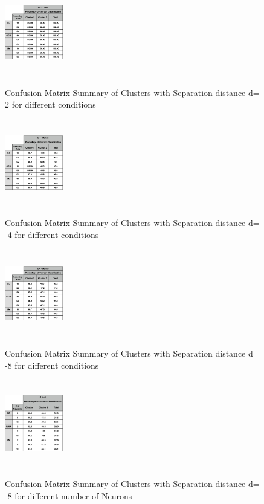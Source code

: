 \documentclass[conference]{IEEEtran}
\begin{document}
\begin{figure}[h!]
\centering
{\includegraphics[width=1in,height=1.5in,clip,keepaspectratio]{Confusion_Matrix_Summary_d2.png} }\\
\caption{Confusion Matrix Summary of Clusters with Separation distance d= 2 for different conditions}
\end{figure}
\begin{figure}[h!]
\centering
{\includegraphics[width=1in,height=1.5in,clip,keepaspectratio]{Confusion_Matrix_Summary_d4.png} }\\
\caption{Confusion Matrix Summary of Clusters with Separation distance d= -4 for different conditions}
\end{figure}
\begin{figure}[h!]
\centering
{\includegraphics[width=1in,height=1.5in,clip,keepaspectratio]{Confusion_Matrix_Summary_d8.png} }\\
\caption{Confusion Matrix Summary of Clusters with Separation distance d= -8 for different conditions}
\end{figure}

\begin{figure}[h!]
\centering
{\includegraphics[width=1in,height=1.5in,clip,keepaspectratio]{Cms_dn.png} }\\
\caption{Confusion Matrix Summary of Clusters with Separation distance d= -8 for different  number of Neurons}
\end{figure}
\end{document}
